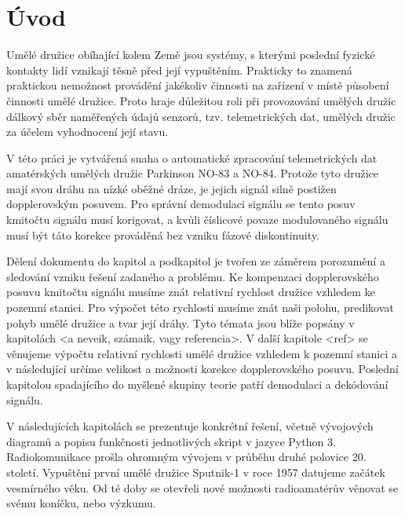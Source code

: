 \chapter*{Úvod}
{}

Umělé družice obíhající kolem Země jsou systémy, s kterými poslední fyzické kontakty lidí vznikají těsně před její vypuštěním. Prakticky to znamená praktickou nemožnost provádění jakékoliv činnosti na zařízení v místě působení činnosti umělé družice. Proto hraje důležitou roli při provozování umělých družic  dálkový sběr naměřených údajů senzorů, tzv. telemetrických dat, umělých družic za účelem vyhodnocení její stavu.

V této práci je vytvářená snaha o automatické zpracování telemetrických dat amatérských umělých družic Parkinson NO-83 a NO-84. Protože tyto družice mají svou dráhu na nízké oběžné dráze, je jejich signál silně postižen dopplerovským posuvem. Pro správní demodulaci signálu se tento posuv kmitočtu signálu musí korigovat, a kvůli číslicové povaze modulovaného signálu musí být táto korekce prováděná bez vzniku fázové diskontinuity.

Dělení dokumentu do kapitol a podkapitol je tvořen ze záměrem porozumění a sledování vzniku řešení zadaného a problému. Ke kompenzaci dopplerovského posuvu kmitočtu signálu musíme znát relativní rychlost družice vzhledem ke pozemní stanici. Pro výpočet této rychlosti musíme znát naši polohu, predikovat pohyb umělé družice a tvar její dráhy. Tyto témata jsou blíže popsány v kapitolách <a neveik, számaik, vagy referencia>. V další kapitole <ref> se věnujeme výpočtu relativní rychlosti umělé družice vzhledem k pozemní stanici a v následující určíme velikost a možnosti korekce dopplerovského posuvu. Poslední kapitolou spadajícího do myšlené skupiny teorie patří demodulaci a dekódování signálu.

V následujících kapitolách se prezentuje konkrétní řešení, včetně vývojových diagramů a popisu funkčnosti jednotlivých skript v jazyce Python 3.
Radiokomunikace prošla ohromným vývojem v průběhu druhé polovice 20. století. Vypuštění první umělé družice Sputnik-1 v roce 1957 datujeme začátek vesmírného věku. Od té doby se otevřeli nové možnosti radioamatérův věnovat se svému koníčku, nebo výzkumu.

